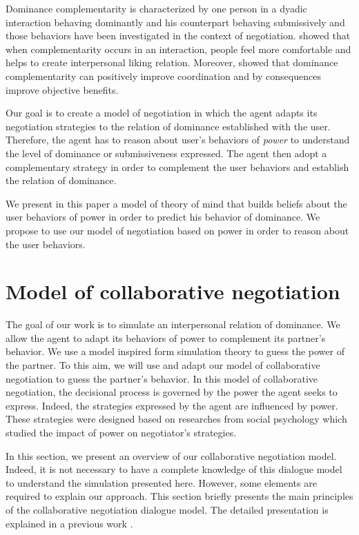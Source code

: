 \documentclass[conference, letterpaper]{IEEEtran}
\begin{document}
	Dominance complementarity is characterized by one person in a dyadic interaction behaving dominantly and his counterpart behaving submissively \cite{tiedens2003power} and those behaviors have been investigated in the context of negotiation. \cite{tiedens2003power} showed that when complementarity occurs in an interaction, people feel more comfortable and helps to create interpersonal liking relation.
	Moreover, \cite{wiltermuth2015benefits} showed that dominance complementarity can positively improve coordination and by consequences improve objective benefits.
	
	Our goal is to create a model of negotiation in which the agent adapts its negotiation strategies to the relation of dominance established with the user. Therefore, the agent has to reason about user's behaviors of \emph{power} to understand the level of dominance or submissiveness expressed. The agent then adopt a complementary strategy in order to complement the user behaviors and establish the relation of dominance.
	
	We present in this paper a model of theory of mind that builds beliefs about the user behaviors of power in order to predict his behavior of dominance. We propose to use our model of negotiation based on power in order to reason about the user behaviors. 
	
	
	\section{Model of collaborative negotiation}
	The goal of our work is to simulate an interpersonal relation of dominance. We allow the agent to adapt its behaviors of power to complement its partner's behavior. We use a model inspired form simulation theory to guess the power of the partner. To this aim, we will use and adapt our model of collaborative negotiation to guess the partner's behavior. In this model of collaborative negotiation, the decisional process is governed by the power the agent seeks to express. Indeed, the strategies expressed by the agent are influenced by power. These strategies were designed based on researches from social psychology which studied the impact of power on negotiator's strategies. 
	
	In this section, we present an overview of our collaborative negotiation model. Indeed, it is not necessary to have a complete knowledge of this dialogue model to understand the simulation presented here. However, some elements are required to explain our approach. This section briefly presents the main principles of the collaborative negotiation dialogue model. The detailed presentation is explained in a previous work \cite{ouali2017computational}.
	
\end{document}
